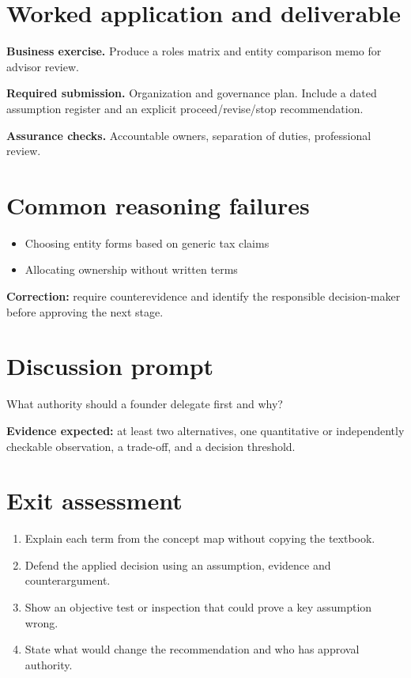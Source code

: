\documentclass[11pt,letterpaper]{article}
\begin{document}
\section{Worked application and deliverable}
\textbf{Business exercise.} Produce a roles matrix and entity comparison memo for advisor review.\par\textbf{Required submission.} Organization and governance plan. Include a dated assumption register and an explicit proceed/revise/stop recommendation.\par\textbf{Assurance checks.} Accountable owners, separation of duties, professional review.
\section{Common reasoning failures}
\begin{itemize}[leftmargin=*,itemsep=3pt]
\item Choosing entity forms based on generic tax claims
\item Allocating ownership without written terms
\end{itemize}
\noindent\textbf{Correction:} require counterevidence and identify the responsible decision-maker before approving the next stage.
\section{Discussion prompt}
What authority should a founder delegate first and why?\par\medskip\textbf{Evidence expected:} at least two alternatives, one quantitative or independently checkable observation, a trade-off, and a decision threshold.
\section{Exit assessment}
\begin{enumerate}[leftmargin=*,itemsep=5pt]
\item Explain each term from the concept map without copying the textbook.
\item Defend the applied decision using an assumption, evidence and counterargument.
\item Show an objective test or inspection that could prove a key assumption wrong.
\item State what would change the recommendation and who has approval authority.
\end{enumerate}

\end{document}
